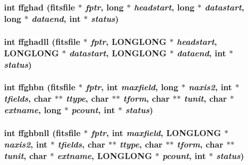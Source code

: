 \subsubsection{\setlength{\rightskip}{0pt plus 5cm}int ffghad (\bf{fitsfile} $\ast$ {\em fptr}, long $\ast$ {\em headstart}, long $\ast$ {\em datastart}, long $\ast$ {\em dataend}, int $\ast$ {\em status})}\label{test_2shm__client_2fitsio_8h_e1b924d5db7f75a39e445055e1bb12cc}


\subsubsection{\setlength{\rightskip}{0pt plus 5cm}int ffghadll (\bf{fitsfile} $\ast$ {\em fptr}, \bf{LONGLONG} $\ast$ {\em headstart}, \bf{LONGLONG} $\ast$ {\em datastart}, \bf{LONGLONG} $\ast$ {\em dataend}, int $\ast$ {\em status})}\label{test_2shm__client_2fitsio_8h_d9af6a189f3d9ea5cab7da778ed4cdd2}


\subsubsection{\setlength{\rightskip}{0pt plus 5cm}int ffghbn (\bf{fitsfile} $\ast$ {\em fptr}, int {\em maxfield}, long $\ast$ {\em naxis2}, int $\ast$ {\em tfields}, char $\ast$$\ast$ {\em ttype}, char $\ast$$\ast$ {\em tform}, char $\ast$$\ast$ {\em tunit}, char $\ast$ {\em extname}, long $\ast$ {\em pcount}, int $\ast$ {\em status})}\label{test_2shm__client_2fitsio_8h_bc0f689fe3484d2f9c8a9703b058b342}


\subsubsection{\setlength{\rightskip}{0pt plus 5cm}int ffghbnll (\bf{fitsfile} $\ast$ {\em fptr}, int {\em maxfield}, \bf{LONGLONG} $\ast$ {\em naxis2}, int $\ast$ {\em tfields}, char $\ast$$\ast$ {\em ttype}, char $\ast$$\ast$ {\em tform}, char $\ast$$\ast$ {\em tunit}, char $\ast$ {\em extname}, \bf{LONGLONG} $\ast$ {\em pcount}, int $\ast$ {\em status})}\label{test_2shm__client_2fitsio_8h_63346aca0b8254ae989a8c62e45a532a}



